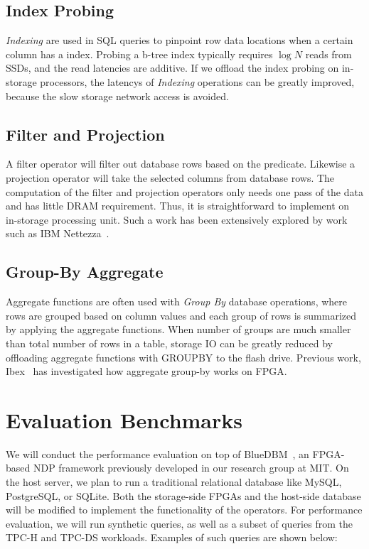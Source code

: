 \documentclass{article}
\newcommand{\indexing}{\textit{Indexing}\xspace}
\newcommand{\groupby}{\textit{Group By}\xspace}
\begin{document}
\subsection{Index Probing}
\indexing are used in SQL queries to pinpoint row data locations when a certain column has a index.
Probing a b-tree index typically requires $\log{N}$ reads from SSDs, and the read latencies are additive.
If we offload  the index probing on in-storage processors, the latencys of \indexing operations can be greatly improved, because the slow storage network access is avoided.

\subsection{Filter and Projection}

A filter operator will filter out database rows based on the predicate.
Likewise a projection operator will take the selected columns from database rows.
The computation of the filter and projection operators only needs one pass of the data and has little DRAM requirement.
Thus, it is straightforward to implement on in-storage processing unit.
Such a work has been extensively explored by work such as IBM Nettezza~\cite{netezza}.

\subsection{Group-By Aggregate}

Aggregate functions are often used with \groupby database operations, where rows are grouped based on column values and each group of rows is summarized by applying the aggregate functions.
When number of groups are much smaller than total number of rows in a table, storage IO can be greatly reduced by offloading aggregate functions with GROUPBY to the flash drive.
Previous work, Ibex~\cite{ibex} has investigated how aggregate group-by works on FPGA.




\section{Evaluation Benchmarks}
\label{sec:eval}

We will conduct the performance evaluation on top of BlueDBM~\cite{bluedbm}, an FPGA-based NDP framework previously developed in our research group at MIT. On the host server, we plan to run a traditional relational database like MySQL, PostgreSQL, or SQLite. Both the storage-side FPGAs and the host-side database will be modified to implement the functionality of the operators. For performance evaluation, we will run synthetic queries, as well as a subset of queries from the TPC-H and TPC-DS workloads. Examples of such queries are shown below:
\end{document}
